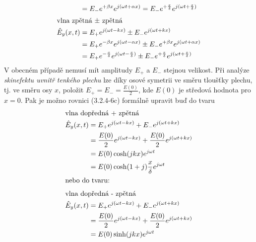 {\begin{subequations}
\begin{align}
              &= E_-e^{+\beta x}e^{j(\omega t+\alpha x)}    
               = E_-e^{+\frac{x}{\delta}}e^{j(\omega t+\frac{x}{\delta})} \label{ES:eq_elmagp49b} \\
            \shortintertext{vlna zpětná \(\pm\) zpětná}
            \hat{E}_y(x,t) 
              &= E_+e^{j(\omega t - kx)} \pm E_-e^{j(\omega t + kx)}                    \nonumber \\
              &= E_+e^{-\beta x}e^{j(\omega t - \alpha x)} \pm
                 E_-e^{+\beta x}e^{j(\omega t + \alpha x)}                              \nonumber \\
              &= E_+e^{-\frac{x}{\delta}}e^{j(\omega t - \frac{x}{\delta})}  \pm
                 E_-e^{+\frac{x}{\delta}}e^{j(\omega t + \frac{x}{\delta})}  \label{ES:eq_elmagp49c}
          \end{align}
        \end{subequations}
        V obecném případě nemusí mít amplitudy \(E_+\) a \(E_-\) stejnou velikost. Při analýze 
        \emph{skinefektu uvnitř tenkého plechu} lze díky osové symetrii ve směru tloušťky plechu, 
        tj. ve směru osy \(x\), položit \(E_+ = E_- = \frac{E(0)}{2}\), kde \(E(0)\) je středová 
        hodnota pro \(x = 0\). Pak je možno rovnici (3.2.4-6c) formálně upravit buď do tvaru
        \begin{subequations}
          \begin{align}
            \shortintertext{vlna dopředná + zpětná}
            \hat{E}_y(x,t) 
              &= E_+e^{j(\omega t - kx)} + E_-e^{j(\omega t + kx)}           \nonumber \\
              &= \frac{E(0)}{2}e^{j(\omega t - kx)} +  
                 \frac{E(0)}{2}e^{j(\omega t + kx)}                          \nonumber \\
              &= E(0)\cosh(jkx)e^{j\omega t}                                 \nonumber \\
              &= E(0)\cosh(1+j)\frac{x}{\delta}e^{j\omega t}   \label{ES:eq_elmagp50a} \\
            \shortintertext{nebo do tvaru:}
            \shortintertext{vlna dopředná - zpětná}
            \hat{E}_y(x,t) 
              &= E_+e^{j(\omega t - kx)} + E_-e^{j(\omega t + kx)}           \nonumber \\
              &= \frac{E(0)}{2}e^{j(\omega t - kx)} + 
                 \frac{E(0)}{2}e^{j(\omega t + kx)}                          \nonumber \\
              &= E(0)\sinh(jkx)e^{j\omega t}                                 \nonumber \\

\end{align}
\end{subequations}}
